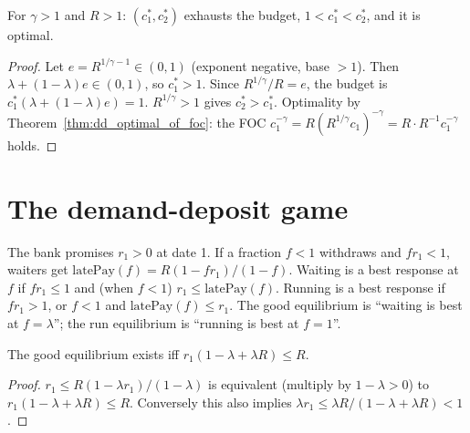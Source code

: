 \begin{theorem}
\label{thm:dd_crra_optimum}
\leanok
{}
For $\gamma > 1$ and $R > 1$: $(c_1^*, c_2^*)$ exhausts the budget, $1 < c_1^* < c_2^*$, and it is optimal.
\end{theorem}
\begin{proof}
\leanok
Let $e = R^{1/\gamma - 1} \in (0, 1)$ (exponent negative, base $> 1$). Then $\lambda + (1-\lambda)e \in (0, 1)$, so
$c_1^* > 1$. Since $R^{1/\gamma}/R = e$, the budget is $c_1^*(\lambda + (1-\lambda)e) = 1$. $R^{1/\gamma} > 1$ gives
$c_2^* > c_1^*$. Optimality by Theorem~\ref{thm:dd_optimal_of_foc}: the FOC
$c_1^{-\gamma} = R (R^{1/\gamma}c_1)^{-\gamma} = R \cdot R^{-1} c_1^{-\gamma}$ holds.
\end{proof}

\section{The demand-deposit game}
\label{sec:dd_game}

\begin{definition}
\label{def:dd_bank}
\leanok
The bank promises $r_1 > 0$ at date 1. If a fraction $f < 1$ withdraws and $f r_1 < 1$, waiters get
$\mathrm{latePay}(f) = R(1 - f r_1)/(1 - f)$. Waiting is a best response at $f$ if $f r_1 \le 1$ and (when $f < 1$)
$r_1 \le \mathrm{latePay}(f)$. Running is a best response if $f r_1 > 1$, or $f < 1$ and $\mathrm{latePay}(f) \le r_1$.
The good equilibrium is ``waiting is best at $f = \lambda$''; the run equilibrium is ``running is best at $f = 1$''.
\end{definition}

\begin{theorem}
\label{thm:dd_good_iff}
\leanok
{}
The good equilibrium exists iff $r_1(1 - \lambda + \lambda R) \le R$.
\end{theorem}
\begin{proof}
\leanok
$r_1 \le R(1 - \lambda r_1)/(1 - \lambda)$ is equivalent (multiply by $1 - \lambda > 0$) to $r_1(1 - \lambda + \lambda R) \le R$.
Conversely this also implies $\lambda r_1 \le \lambda R/(1 - \lambda + \lambda R) < 1$.
\end{proof}

